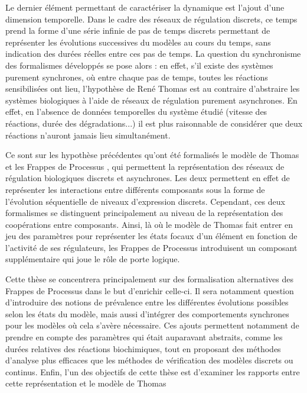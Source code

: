Le dernier élément permettant de caractériser la dynamique est l'ajout d'une
dimension temporelle.
Dans le cadre des réseaux de régulation discrets, ce temps prend la forme d'une série
infinie de pas de temps discrets permettant de représenter les évolutions
successives du modèles au cours du temps, sans indication des durées réelles
entre ces pas de temps.
La question du synchronisme des formalismes développés se pose alors :
en effet, s'il existe des systèmes purement synchrones, où entre chaque pas de temps,
toutes les réactions sensibilisées ont lieu,
l'hypothèse de René Thomas \toref
est au contraire d'abstraire les systèmes biologiques à l'aide
de réseaux de régulation purement asynchrones.
En effet, en l'absence de données temporelles du système étudié
(vitesse des réactions, durée des dégradations...)
il est plus raisonnable de considérer que deux réactions n'auront jamais lieu simultanément.

Ce sont sur les hypothèse précédentes qu'ont été formalisés
le modèle de Thomas \toref
et les Frappes de Processus \toref,
qui permettent la représentation des réseaux de régulation biologiques discrets et asynchrones.
Les deux permettent en effet de représenter les interactions entre différents composants
sous la forme de l'évolution séquentielle de niveaux d'expression discrets.
Cependant, ces deux formalismes se distinguent principalement au niveau de la représentation
des coopérations entre composants.
Ainsi, là où le modèle de Thomas fait entrer en jeu des paramètres pour représenter
les états focaux d'un élément en fonction de l'activité de ses régulateurs, 
les Frappes de Processus introduisent un composant supplémentaire qui joue le rôle
de porte logique.

Cette thèse se concentrera principalement sur des formalisation alternatives des
Frappes de Processus dans le but d'enrichir celle-ci.
Il sera notamment question d'introduire des notions de prévalence entre les différentes
évolutions possibles selon les états du modèle, mais aussi d'intégrer
des comportements synchrones pour les modèles où cela s'avère nécessaire.
Ces ajouts permettent notamment de prendre en compte des paramètres qui était
auparavant abstraits, comme les durées relatives des réactions biochimiques,
tout en proposant des méthodes d'analyse plus efficaces
que les méthodes de vérification des modèles discrets ou continus.
Enfin, l'un des objectifs de cette thèse est d'examiner
les rapports entre cette représentation et le modèle de Thomas \TODO



